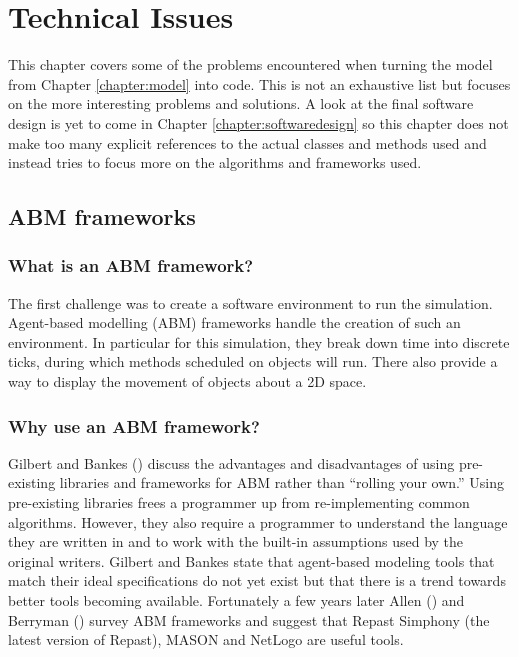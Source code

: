 \chapter{Technical Issues}\label{chapter:technicalissues}
This chapter covers some of the problems encountered when turning the model from Chapter \ref{chapter:model} into code. This is not an exhaustive list but focuses on the more interesting problems and solutions. A look at the final software design is yet to come in Chapter \ref{chapter:softwaredesign} so this chapter does not make too many explicit references to the actual classes and methods used and instead tries to focus more on the algorithms and frameworks used.

  \section{ABM frameworks}
    \subsection{What is an ABM framework?}
    The first challenge was to create a software environment to run the simulation. Agent-based modelling (ABM) frameworks handle the creation of such an environment. In particular for this simulation, they break down time  into discrete ticks, during which methods scheduled on objects will run. There also provide a way to display the movement of objects about a 2D space.
    
    \subsection{Why use an ABM framework?}
    Gilbert and Bankes (\cite{Gilbert2002}) discuss the advantages and
    disadvantages of using pre-existing libraries and frameworks for ABM rather
    than ``rolling your own.'' Using pre-existing libraries frees a
    programmer up from re-implementing common
    algorithms. However, they also require a programmer to understand the
    language they are written in and to work with the built-in
    assumptions used by the original writers. Gilbert and Bankes state
    that agent-based modeling tools that match their ideal specifications
    do not yet exist but that there is a trend towards better
    tools becoming available. Fortunately a few years later Allen (\cite{Allan2009}) and Berryman (\cite{Berryman2008}) survey ABM frameworks and suggest that Repast Simphony (the latest version of Repast), MASON and NetLogo are useful tools.
    
